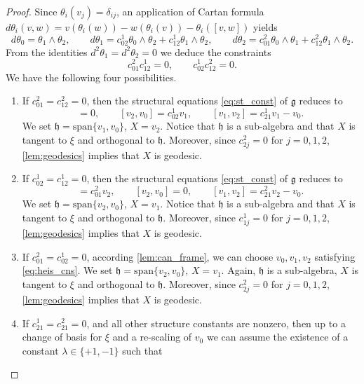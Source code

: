 \documentclass[reqno]{amsart}
\theoremstyle{remark}
\theoremstyle{plain}
\begin{document}
\begin{proof}
\noindent
Since $\theta_i(v_j)=\delta_{ij}$, an application of Cartan formula $d\theta_i(v,w)=v(\theta_i(w))-w(\theta_i(v))-\theta_i([v,w])$ yields
\begin{equation}
	d\theta_0=\theta_1\wedge \theta_2,\qquad d\theta_1=c_{02}^1\theta_0\wedge\theta_2+c_{12}^1\theta_1\wedge\theta_2,\qquad d\theta_2=c_{01}^2\theta_0\wedge\theta_1+c_{12}^2\theta_1\wedge\theta_2.
\end{equation} 
From the identities $d^2\theta_1=d^2\theta_2=0$ we deduce the constraints
    \begin{equation}
        c_{01}^2c_{12}^1=0,\qquad c_{02}^1c_{12}^2=0.
    \end{equation}
    We have the following four possibilities.
    \begin{enumerate}
        \item[$i$.] If $c_{01}^2=c_{12}^2=0$, then the structural equations \eqref{eq:st_const} of $\mathfrak g$ reduces to 
        \begin{equation}
[v_1,v_0]=0,\qquad 
[v_2,v_0]=c_{02}^1v_1,\qquad
[v_1,v_2]=c_{21}^1v_1-v_0.
    \end{equation}
    We set $\mathfrak h=\mathrm{span}\{v_1,v_0\}$, $X=v_2$. Notice that $\mathfrak h$ is a sub-algebra and that $X$ is tangent to $\xi$ and orthogonal to $\mathfrak h$. Moreover, since $c_{2j}^2=0$ for $j=0,1,2$, \cref{lem:geodesics} implies that $X$ is geodesic.
    \item[$ii$.] If $c_{02}^1=c_{12}^1=0$,  then the structural equations \eqref{eq:st_const} of $\mathfrak g$ reduces to 
        \begin{equation}
[v_1,v_0]=c_{01}^2v_2,\qquad 
[v_2,v_0]=0,\qquad
[v_1,v_2]=c_{21}^2v_2-v_0.
    \end{equation}
    We set $\mathfrak h=\mathrm{span}\{v_2,v_0\}$, $X=v_1$. Notice that $\mathfrak h$ is a sub-algebra and that $X$ is tangent to $\xi$ and orthogonal to $\mathfrak h$. Moreover, since $c_{1j}^1=0$ for $j=0,1,2$, \cref{lem:geodesics} implies that $X$ is geodesic.
    \item[$iii$.] If $c_{01}^2=c_{02}^1=0$, according \cref{lem:can_frame}, we can choose $v_0,v_1,v_2$ satisfying \eqref{eq:heis_cns}. We set $\mathfrak{h}=\mathrm{span}\{v_2,v_0\}$, $X=v_1$. Again, $\mathfrak h$ is a sub-algebra, $X$ is tangent to $\xi$ and orthogonal to $\mathfrak h$. Moreover, since $c_{2j}^2=0$ for $j=0,1,2$, \cref{lem:geodesics} implies that $X$ is geodesic.
    \item[$iv$.] If $c_{21}^1=c_{21}^2=0$, and all other structure constants are nonzero, then up to a change of basis for $\xi$ and a re-scaling of $v_0$ we can assume the existence of a constant $\lambda\in\{+1,-1\}$ such that 

\end{enumerate}
\end{proof}
\end{document}
